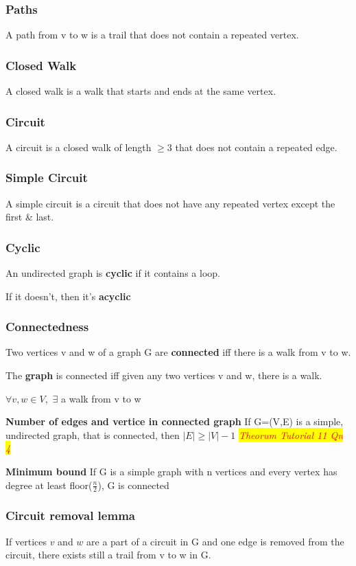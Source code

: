 \documentclass{article}
\newcommand{\theorum}[1]{\quad \quad \colorbox{yellow}{\textit{\textcolor{red}{Theorum #1}}}}
\newcommand{\sub}[1]{\vspace{10pt}\textbf{#1}}
\begin{document}
\subsubsection{Paths}
A path from v to w is a trail that does not contain a repeated vertex.

\subsubsection{Closed Walk}
A closed walk is a walk that starts and ends at the same vertex.

\subsubsection{Circuit}
A circuit is a closed walk of length $\geq 3$ that does not contain a repeated edge.

\subsubsection{Simple Circuit}
A simple circuit is a circuit that does not have any repeated vertex except the first \& last.

\subsubsection{Cyclic}
An undirected graph is \textbf{cyclic} if it contains a loop.

If it doesn't, then it's \textbf{acyclic}

\subsubsection{Connectedness}
Two vertices v and w of a graph G are \textbf{connected} iff there is a walk from v to w.

The \textbf{graph} is connected iff given any two vertices v and w, there is a walk.
\begin{center}
    $\forall v,w \in V,$ $\exists$ a walk from v to w
\end{center}

\sub{Number of edges and vertice in connected graph}
If G=(V,E) is a simple, undirected graph, that is connected, then $|E| \geq |V| - 1$ \theorum{Tutorial 11 Qn 4}

\sub{Minimum bound}
If G is a simple graph with n vertices and every vertex has degree at least floor($\frac{n}{2}$), G is connected

\subsubsection{Circuit removal lemma}
If vertices $v$ and $w$ are a part of a circuit in G and one edge is removed from the circuit, there exists still a trail from v to w in G.
\end{document}
